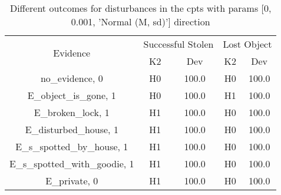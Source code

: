 \begin{table}\begin{tabular}{c|cc|cc}\toprule\multirow{2}{*}{Evidence} & \multicolumn{2}{c}{Successful Stolen} & \multicolumn{2}{c}{Lost Object} \\& {K2} & {Dev} & {K2} & {Dev} \\\midrule
no\_evidence, 0 & H0&100.0&H0&100.0\\E\_object\_is\_gone, 1 & H0&100.0&H1&100.0\\E\_broken\_lock, 1 & H1&100.0&H0&100.0\\E\_disturbed\_house, 1 & H1&100.0&H0&100.0\\E\_s\_spotted\_by\_house, 1 & H1&100.0&H0&100.0\\E\_s\_spotted\_with\_goodie, 1 & H1&100.0&H0&100.0\\E\_private, 0 & H1&100.0&H0&100.0\\\bottomrule\end{tabular}\caption{Different outcomes for disturbances in the cpts with params [0, 0.001, 'Normal (M, sd)'] direction}\end{table}